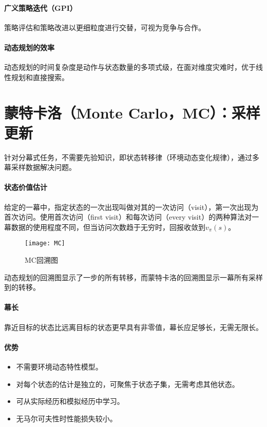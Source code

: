 \documentclass[
12pt, %
a4paper, 
oneside, %
headinclude,footinclude, %
]{scrartcl}
\begin{document}
\paragraph{广义策略迭代（GPI）}
策略评估和策略改进以更细粒度进行交替，可视为竞争与合作。
\paragraph{动态规划的效率}
动态规划的时间复杂度是动作与状态数量的多项式级，在面对维度灾难时，优于线性规划和直接搜索。
\section{蒙特卡洛（Monte Carlo，MC）：采样更新}
针对分幕式任务，不需要先验知识，即状态转移律（环境动态变化规律），通过多幕采样数据解决问题。
\paragraph{状态价值估计}
给定的一幕中，指定状态的一次出现叫做对其的一次访问（visit），第一次出现为首次访问。使用首次访问（first visit）和每次访问（every visit）的两种算法对一幕数据的使用程度不同，但当访问次数趋于无穷时，回报收敛到$ v_{\pi}(s) $。

\begin{figure}[H]
\centering 
\texttt{[image: MC]} 
\caption[MC回溯图]{MC回溯图}
\end{figure}

动态规划的回溯图显示了一步的所有转移，而蒙特卡洛的回溯图显示一幕所有采样到的转移。
\paragraph{幕长}
靠近目标的状态比远离目标的状态更早具有非零值，幕长应足够长，无需无限长。
\paragraph{优势}
\begin{itemize}
\item 不需要环境动态特性模型。
\item 对每个状态的估计是独立的，可聚焦于状态子集，无需考虑其他状态。
\item 可从实际经历和模拟经历中学习。
\item 无马尔可夫性时性能损失较小。
\end{itemize}
\end{document}
